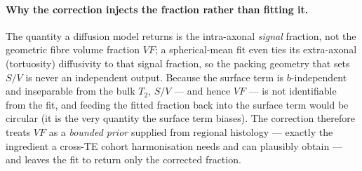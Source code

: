 \paragraph{Why the correction injects the fraction rather than fitting it.} The quantity a
diffusion model returns is the intra-axonal \emph{signal} fraction, not the geometric fibre
volume fraction $VF$; a spherical-mean fit even ties its extra-axonal (tortuosity) diffusivity to
that signal fraction, so the packing geometry that sets $S/V$ is never an independent output.
Because the surface term is $b$-independent and inseparable from the bulk $T_2$, $S/V$ --- and
hence $VF$ --- is not identifiable from the fit, and feeding the fitted fraction back into the
surface term would be circular (it is the very quantity the surface term biases). The correction
therefore treats $VF$ as a \emph{bounded prior} supplied from regional histology --- exactly the
ingredient a cross-TE cohort harmonisation needs and can plausibly obtain --- and leaves the fit
to return only the corrected fraction.

